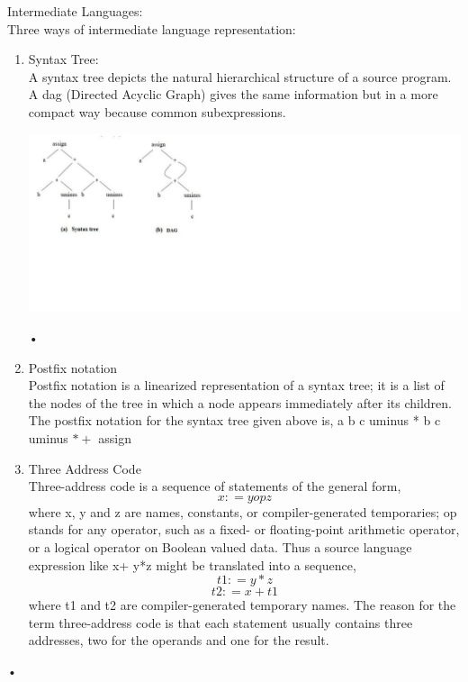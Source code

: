 \documentclass[11pt]{article}
\begin{document}
	\noindent
	Intermediate Languages:\\
	Three ways of intermediate language representation:\\
	\begin{enumerate}
		\item Syntax Tree:\\
		A syntax tree depicts the natural hierarchical structure of a source program. A dag (Directed Acyclic Graph) gives the same information but in a more compact way because common subexpressions.\\
		\begin{center}
			\includegraphics{syntax.png}
		\end{center}•
		
		\item Postfix notation\\
		Postfix notation is a linearized representation of a syntax tree; it is a list of the nodes of the tree in which a node appears immediately after its children. The postfix notation for the syntax tree given above
		is, a b c uminus * b c uminus $* +$ assign
		
		\item Three Address Code\\
		Three-address code is a sequence of statements of the general form,\\
		$$x: = y op z$$
		where x, y and z are names, constants, or compiler-generated temporaries; op stands for any operator, such as a fixed- or floating-point arithmetic operator, or a logical operator on Boolean valued data. Thus a source language expression like x+ y*z might be translated into a sequence,\\
		
		$$t1 : = y * z$$ 
		$$t2 : = x + t1 $$
		where t1 and t2 are compiler-generated temporary names. The reason for the term three-address code is that each statement usually contains three addresses, two for the operands and one for the result.\\
	\end{enumerate}•
	
\end{document}

